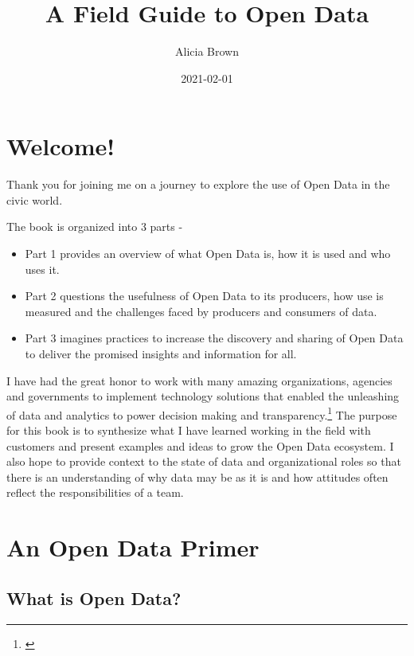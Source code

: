 \documentclass[
]{book}
\title{A Field Guide to Open Data}
\author{Alicia Brown}
\date{2021-02-01}
\providecommand{\tightlist}{%
  \setlength{\itemsep}{0pt}\setlength{\parskip}{0pt}}
\begin{document}
\maketitle

{
\setcounter{tocdepth}{1}
\tableofcontents
}
\hypertarget{welcome}{%
\chapter{Welcome!}\label{welcome}}

Thank you for joining me on a journey to explore the use of Open Data in the civic world.

The book is organized into 3 parts -

\begin{itemize}
\tightlist
\item
  Part 1 provides an overview of what Open Data is, how it is used and who uses it.
\item
  Part 2 questions the usefulness of Open Data to its producers, how use is measured and the challenges faced by producers and consumers of data.
\item
  Part 3 imagines practices to increase the discovery and sharing of Open Data to deliver the promised insights and information for all.
\end{itemize}

I have had the great honor to work with many amazing organizations, agencies and governments to implement technology solutions that enabled the unleashing of data and analytics to power decision making and transparency.\footnote{\citet{blog5years}} The purpose for this book is to synthesize what I have learned working in the field with customers and present examples and ideas to grow the Open Data ecosystem. I also hope to provide context to the state of data and organizational roles so that there is an understanding of why data may be as it is and how attitudes often reflect the responsibilities of a team.

\hypertarget{overview}{%
\chapter{An Open Data Primer}\label{overview}}

\hypertarget{what-is-open-data}{%
\section{What is Open Data?}\label{what-is-open-data}}
\end{document}
